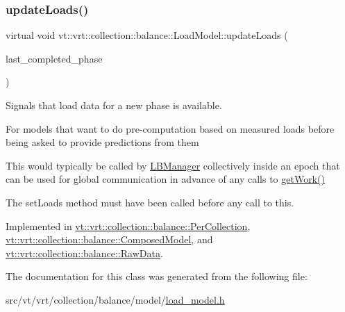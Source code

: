 \mbox{\label{classvt_1_1vrt_1_1collection_1_1balance_1_1_load_model_a4f1c6fb5d7d7a0b147755f025b1d5f5c}} 
\subsubsection{\texorpdfstring{update\+Loads()}{updateLoads()}}
{\footnotesize\ttfamily virtual void vt\+::vrt\+::collection\+::balance\+::\+Load\+Model\+::update\+Loads (\begin{DoxyParamCaption}\item[{\hyperlink{namespacevt_a46ce6733d5cdbd735d561b7b4029f6d7}{Phase\+Type}}]{last\+\_\+completed\+\_\+phase }\end{DoxyParamCaption})\hspace{0.3cm}{\ttfamily [pure virtual]}}



Signals that load data for a new phase is available. 

For models that want to do pre-\/computation based on measured loads before being asked to provide predictions from them

This would typically be called by \hyperlink{structvt_1_1vrt_1_1collection_1_1balance_1_1_l_b_manager}{L\+B\+Manager} collectively inside an epoch that can be used for global communication in advance of any calls to \hyperlink{classvt_1_1vrt_1_1collection_1_1balance_1_1_load_model_ab51ce15ff1ff1341ba921555d4d57159}{get\+Work()}

The {\ttfamily set\+Loads} method must have been called before any call to this. 

Implemented in \hyperlink{structvt_1_1vrt_1_1collection_1_1balance_1_1_per_collection_a2b41fbbe2b684654f8dbfd9207b77501}{vt\+::vrt\+::collection\+::balance\+::\+Per\+Collection}, \hyperlink{classvt_1_1vrt_1_1collection_1_1balance_1_1_composed_model_ad8108b4392d63b7f09e443920a64933a}{vt\+::vrt\+::collection\+::balance\+::\+Composed\+Model}, and \hyperlink{structvt_1_1vrt_1_1collection_1_1balance_1_1_raw_data_a4aaae24a53ead0248b873911ce560a34}{vt\+::vrt\+::collection\+::balance\+::\+Raw\+Data}.



The documentation for this class was generated from the following file\+:\begin{DoxyCompactItemize}
\item 
src/vt/vrt/collection/balance/model/\hyperlink{load__model_8h}{load\+\_\+model.\+h}\end{DoxyCompactItemize}
